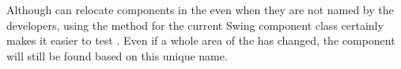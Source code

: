 
Although \jb{} can relocate components in the \gdaut{} even when they are not named by the developers, using the  method for the current Swing component class certainly makes it easier to test \gdauts{}. Even if a whole area of the \gdaut{} has changed, the component will still be found based on this unique name. 
